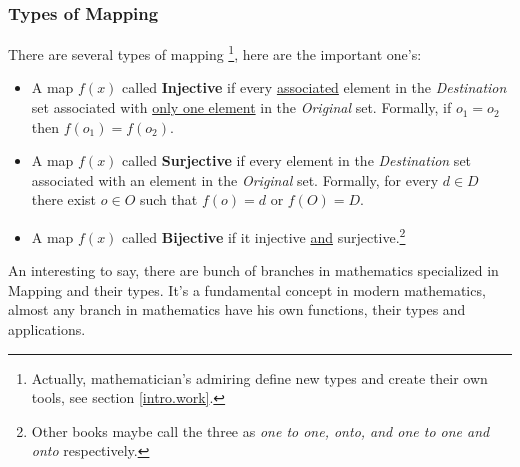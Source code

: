 \subsubsection{Types of Mapping}
There are several types of mapping \footnote{Actually, mathematician's admiring define new types and create their own tools, see section \ref{intro.work}.}, here are the important one's:
\begin{itemize}
    \item A map $f(x)$ called {\bf Injective} if every \underline{associated} element in the {\it Destination} set associated with \underline{only one element} in the {\it Original} set. Formally, if $o_1 = o_2$ then $f(o_1) = f(o_2)$.
    \item A map $f(x)$ called {\bf Surjective} if every element in the {\it Destination} set associated with an element in the {\it Original} set. Formally, for every $d \in D$ there exist $o \in O$ such that $f(o)=d$ or $f(O)=D$.
    \item A map $f(x)$ called {\bf Bijective} if it injective \underline{and} surjective.\footnote{Other books maybe call the three as {\it  one to one, onto, and one to one and onto} respectively.}
\end{itemize}
An interesting to say, there are bunch of branches in mathematics specialized in Mapping and their types. It's a fundamental concept in modern mathematics, almost any branch in mathematics have his own functions, their types and applications.